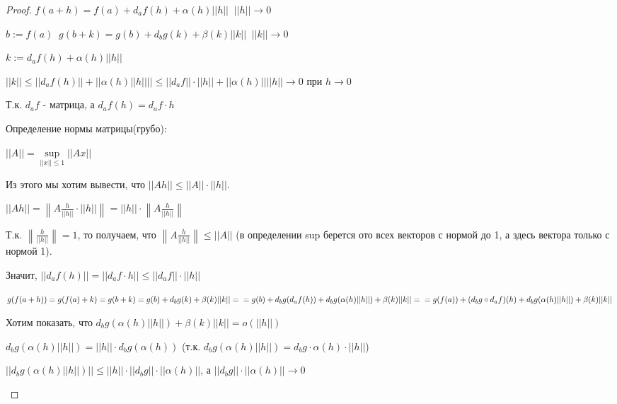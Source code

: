 \begin{proof}\slashns
    
    $f(a+h) = f(a) + d_a f(h) + \alpha(h) ||h|| \;\; ||h|| \to 0$
    
    $b:= f(a) \;\; g(b+k) = g(b) + d_b g(k) + \beta(k) ||k|| \;\; ||k|| \to 0$
    
    $k:= d_a f(h) + \alpha(h) ||h||$
    
    $||k|| \le ||d_a f(h)|| + ||\alpha(h) ||h|| || \le ||d_a f|| \cdot ||h|| + ||\alpha(h)|| ||h|| \to 0$ при $h \to 0$

    \begin{remark} \thmslashn

        Т.к. $d_a f$ - матрица, а $d_a f(h) = d_a f \cdot h$

        Определение нормы матрицы(грубо):

        $||A|| = \sup\limits_{||x|| \le 1} ||A x||$

        Из этого мы хотим вывести, что $||A h|| \le ||A|| \cdot ||h||$.

        $||A h|| = \left\lVert A \frac{h}{||h||} \cdot ||h|| \right\rVert = ||h|| \cdot \left\lVert A \frac{h}{||h||} \right\rVert$

        Т.к. $\left\lVert \frac{h}{||h||} \right\rVert = 1$, то получаем, что $\left\lVert A \frac{h}{||h||} \right\rVert \le ||A||$ (в определении sup берется ото всех векторов с нормой до 1, а здесь вектора только с нормой 1).

        Значит, $||d_a f(h)|| = ||d_a f \cdot h|| \le ||d_a f|| \cdot ||h||$

    \end{remark} \thmslashn
    
    $g(f(a+h)) = g(f(a) + k) = g(b + k) = g(b) + d_b g(k) + \beta(k) ||k|| =\\= g(b) + d_b g(d_a f(h)) + d_b g(\alpha(h) ||h||)+ \beta(k) ||k|| =\\= g(f(a)) + (d_b g \circ d_a f)(h) + d_b g(\alpha(h) ||h||) + \beta(k) ||k||$
    
    Хотим показать, что $d_b g(\alpha(h) ||h||) + \beta(k) ||k|| = o(||h||)$
    
    $d_b g(\alpha(h) ||h||) = ||h|| \cdot d_b g(\alpha(h))$ (т.к. $d_b g(\alpha(h) ||h||) = d_b g \cdot \alpha(h) \cdot ||h||$)
    
    $||d_b g(\alpha(h) ||h||)|| \le ||h|| \cdot ||d_b g|| \cdot ||\alpha(h)||$, а $||d_b g|| \cdot ||\alpha(h)|| \to 0$

    \begin{remark} \thmslashn


\end{remark}
\end{proof}
